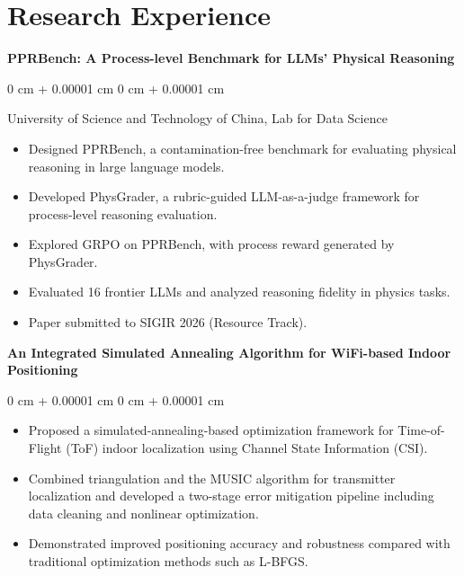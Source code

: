 \documentclass[10pt, letterpaper]{article}
\newenvironment{highlights}{
    \begin{itemize}[
        topsep=0.10 cm,
        parsep=0.10 cm,
        partopsep=0pt,
        itemsep=0pt,
        leftmargin=0 cm + 10pt
    ]
}{
    \end{itemize}
} %
\newenvironment{onecolentry}{
    \begin{adjustwidth}{
        0 cm + 0.00001 cm
    }{
        0 cm + 0.00001 cm
    }
}{
    \end{adjustwidth}
} %
\begin{document}
    
    \section{Research Experience}

\textbf{PPRBench: A Process-level Benchmark for LLMs’ Physical
Reasoning} 
\vspace{0.05 cm}
\begin{onecolentry}
University of Science and Technology of China, Lab for Data Science
\begin{highlights}
    \item Designed PPRBench, a contamination-free benchmark for evaluating physical reasoning in large language models.
    \item Developed PhysGrader, a rubric-guided LLM-as-a-judge framework for process-level reasoning evaluation.
    \item Explored GRPO on PPRBench, with process reward generated by PhysGrader.
    \item Evaluated 16 frontier LLMs and analyzed reasoning fidelity in physics tasks.
    \item Paper submitted to SIGIR 2026 (Resource Track).
\end{highlights}
\end{onecolentry}

        \vspace{0.2cm}
    
            \textbf{An Integrated Simulated Annealing Algorithm for WiFi-based Indoor Positioning}
        \vspace{0.10 cm}
        \begin{onecolentry}
            \begin{highlights}
    \item Proposed a simulated-annealing-based optimization framework for Time-of-Flight (ToF) indoor localization using Channel State Information (CSI).
    \item Combined triangulation and the MUSIC algorithm for transmitter localization and developed a two-stage error mitigation pipeline including data cleaning and nonlinear optimization.
    \item Demonstrated improved positioning accuracy and robustness compared with traditional optimization methods such as L-BFGS.
            \end{highlights}
        \end{onecolentry}

        \vspace{0.2cm}
        
\end{document}

